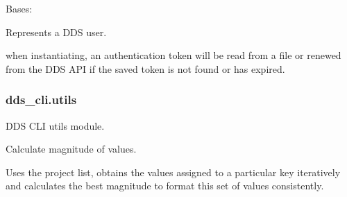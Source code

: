 \documentclass[letterpaper,10pt,english]{sphinxmanual}
\begin{document}

\begin{fulllineitems}
\label{\detokenize{dds_cli:dds_cli.user.User}}
\sphinxAtStartPar
Bases: 

\sphinxAtStartPar
Represents a DDS user.

\sphinxAtStartPar
when instantiating, an authentication token will be read from a file or
renewed from the DDS API if the saved token is not found or has expired.

\begin{fulllineitems}
\label{\detokenize{dds_cli:dds_cli.user.User.token_dict}}
\end{fulllineitems}


\end{fulllineitems}



\subsubsection{dds\_cli.utils}
\label{\detokenize{dds_cli:module-dds_cli.utils}}\label{\detokenize{dds_cli:dds-cli-utils}}
\sphinxAtStartPar
DDS CLI utils module.

\begin{fulllineitems}
\label{\detokenize{dds_cli:dds_cli.utils.calculate_magnitude}}
\sphinxAtStartPar
Calculate magnitude of values.

\sphinxAtStartPar
Uses the project list, obtains the values assigned to a particular key iteratively and
calculates the best magnitude to format this set of values consistently.

\end{fulllineitems}
\end{document}
